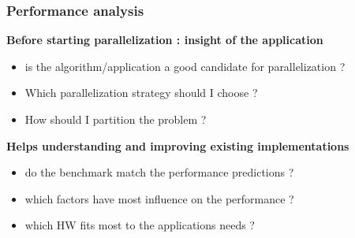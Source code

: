 \begin{frame}[containsverbatim]
\frametitle{Performance analysis}
\textbf{Before starting parallelization : insight of the application} 
\begin{itemize}
	\item{is the algorithm/application a good candidate for parallelization ?}
	\item{Which parallelization strategy should I choose ?}
	\item{How should I partition the problem ?}
\end{itemize}
\textbf{Helps understanding and improving existing implementations}
\begin{itemize}
	\item{do the benchmark match the performance predictions ?}
	\item{which factors have most influence on the performance ?}
	\item{which HW fits most to the applications needs ?}
\end{itemize}
\end{frame}




